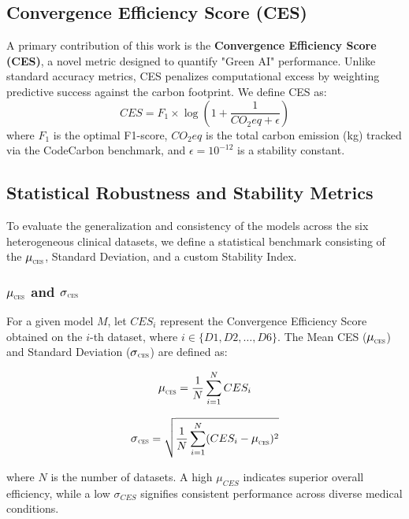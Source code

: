 \documentclass[conference]{IEEEtran}
\newcommand{\muCES}{\scalebox{1.1}{$\mu$}_{\scalebox{0.5}{CES}}}
\newcommand{\sigmaCES}{\scalebox{1.1}{$\sigma$}_{\scalebox{0.5}{CES}}}
\begin{document}
\subsection{Convergence Efficiency Score (CES)}
A primary contribution of this work is the \textbf{Convergence Efficiency Score (CES)}, a novel metric designed to quantify "Green AI" performance. Unlike standard accuracy metrics, CES penalizes computational excess by weighting predictive success against the carbon footprint. We define CES as:
\vspace{-0.5ex}
\begin{equation}
    CES = F_1 \times \log\left(1 + \frac{1}{CO_2eq + \epsilon}\right)
\end{equation}
\vspace{-0.5ex}
where $F_1$ is the optimal F1-score, $CO_2eq$ is the total carbon emission (kg) tracked via the CodeCarbon benchmark, and $\epsilon = 10^{-12}$ is a stability constant.
\subsection{Statistical Robustness and Stability Metrics}
To evaluate the generalization and consistency of the models across the six heterogeneous clinical datasets, we define a statistical benchmark consisting of the $\muCES$, Standard Deviation, and a custom Stability Index.

\subsubsection{$\muCES$ and $\sigmaCES$}
For a given model $M$, let $CES_{i}$ represent the Convergence Efficiency Score obtained on the $i$-th dataset, where $i \in \{D1, D2, \dots, D6\}$. The Mean CES ($\muCES$) and Standard Deviation ($\sigmaCES$) are defined as:

\vspace{-0.5ex}
\begin{equation}
    \muCES = \frac{1}{N} \sum_{i=1}^{N} CES_{i}
\end{equation}
\vspace{-0.5ex}

\vspace{-0.5ex}
\begin{equation}
    \sigmaCES = \sqrt{\frac{1}{N} \sum_{i=1}^{N} (CES_{i} - \muCES)^2}
\end{equation}
\vspace{-0.5ex}

where $N$ is the number of datasets. A high $\mu_{CES}$ indicates superior overall efficiency, while a low $\sigma_{CES}$ signifies consistent performance across diverse medical conditions.
\end{document}
